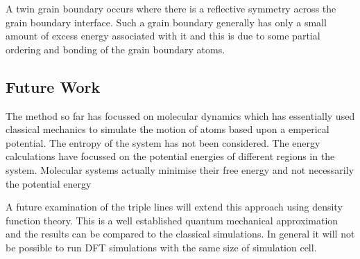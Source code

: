 \documentclass[12pt,a4paper]{book}
\begin{document}
A twin grain boundary occurs where there is a reflective symmetry across the grain boundary interface. Such a grain boundary generally has only a small amount of excess energy associated with it and this is due to some partial ordering and bonding of the grain boundary atoms.

\subsection{Future Work}

The method so far has focussed on molecular dynamics which has essentially used classical mechanics to simulate the motion of atoms based upon a emperical potential. The entropy of the system has not been considered. The energy calculations have focussed on the potential energies of different regions in the system. Molecular systems actually minimise their free energy and not necessarily the potential energy 

A future examination of the triple lines will extend this approach using density function theory. This is a well established quantum mechanical approximation and the results can be compared to the classical simulations. In general it will not be possible to run DFT simulations with the same size of simulation cell.  

 
\end{document}
